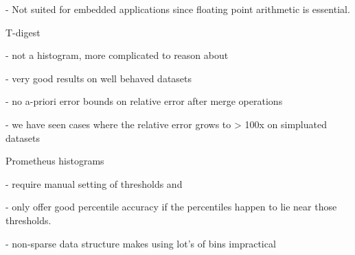 \documentclass{article}
\theoremstyle{plain}
\theoremstyle{remark}
\begin{document}
- Not suited for embedded applications since floating point arithmetic is essential.

T-digest

- not a histogram, more complicated to reason about

- very good results on well behaved datasets

- no a-priori error bounds on relative error after merge operations

- we have seen cases where the relative error grows to > 100x on simpluated datasets

Prometheus histograms

- require manual setting of thresholds and

- only offer good percentile accuracy if the percentiles happen to lie near those thresholds.

- non-sparse data structure makes using lot's of bins impractical
\end{document}
